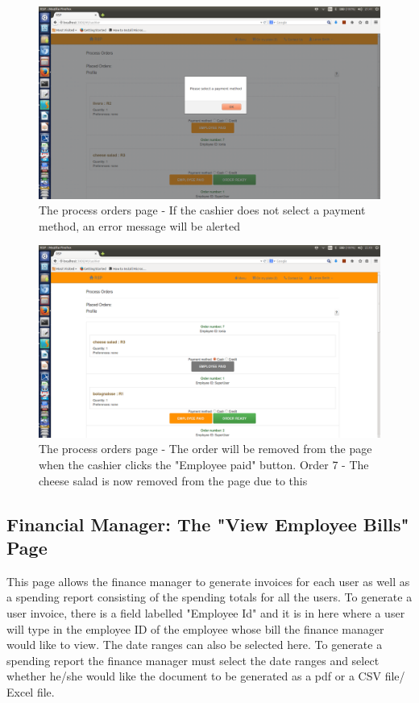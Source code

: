 \documentclass[a4paper,12pt]{report}
\begin{document}
\begin{figure}[H]
  \centering
    \includegraphics[width=1.0\textwidth]{screenshots/noPaymentMethSelected.png}
    \caption{The process orders page - If the cashier does not select a payment method, an error message will be alerted}
\end{figure}

\begin{figure}[H]
  \centering
    \includegraphics[width=1.0\textwidth]{screenshots/empPaid.png}
    \caption{The process orders page - The order will be removed from the page when the cashier clicks the "Employee paid" button. Order 7 - The cheese salad is now removed from the page due to this}
\end{figure}

\subsection{Financial Manager: The "View Employee Bills" Page}
This page allows the finance manager to generate invoices for each user as well as a spending report consisting of the spending totals for all the users. To generate a user invoice, there is a field labelled "Employee Id" and it is in here where a user will type in the employee ID of the employee whose bill the finance manager would like to view. The date ranges can also be selected here. To generate a spending report the finance manager must select the date ranges and select whether he/she would like the document to be generated as a pdf or a CSV file/ Excel file.
\end{document}
